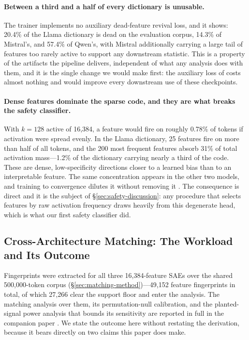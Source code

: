\documentclass[11pt]{article}
\begin{document}
\paragraph{Between a third and a half of every dictionary is unusable.} The trainer implements no auxiliary dead-feature revival loss, and it shows: 20.4\% of the Llama dictionary is dead on the evaluation corpus, 14.3\% of Mistral's, and 57.4\% of Qwen's, with Mistral additionally carrying a large tail of features too rarely active to support any downstream statistic. This is a property of the artifacts the pipeline delivers, independent of what any analysis does with them, and it is the single change we would make first: the auxiliary loss of \citet{gao2024scaling} costs almost nothing and would improve every downstream use of these checkpoints.

\paragraph{Dense features dominate the sparse code, and they are what breaks the safety classifier.} With $k = 128$ active of 16,384, a feature would fire on roughly 0.78\% of tokens if activation were spread evenly. In the Llama dictionary, 25 features fire on more than half of all tokens, and the 200 most frequent features absorb 31\% of total activation mass---1.2\% of the dictionary carrying nearly a third of the code. These are dense, low-specificity directions closer to a learned bias than to an interpretable feature. The same concentration appears in the other two models, and training to convergence dilutes it without removing it \citep{melton2026saecomparison}. The consequence is direct and it is the subject of \S\ref{sec:safety-discussion}: any procedure that selects features by raw activation frequency draws heavily from this degenerate head, which is what our first safety classifier did.

\subsection{Cross-Architecture Matching: The Workload and Its Outcome}
\label{sec:matching}

Fingerprints were extracted for all three 16,384-feature SAEs over the shared 500,000-token corpus (\S\ref{sec:matching-method})---49,152 feature fingerprints in total, of which 27,266 clear the support floor and enter the analysis. The matching analysis over them, its permutation-null calibration, and the planted-signal power analysis that bounds its sensitivity are reported in full in the companion paper \citep{melton2026saecomparison}. We state the outcome here without restating the derivation, because it bears directly on two claims this paper does make.
\end{document}
